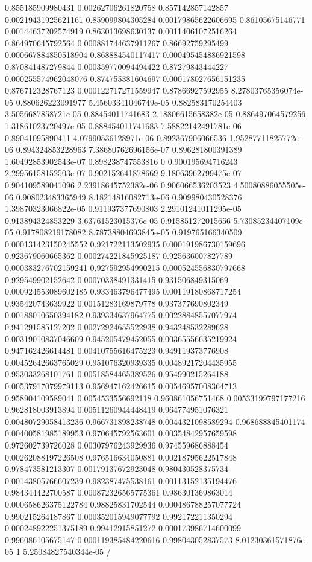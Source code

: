 \begin{table}
\begin{tabu}
\begin{sparkline}{10}
0.855185909980431 0.00262706261820758 0.857142857142857 0.00219431925621161 0.859099804305284 0.00179865622606695 0.86105675146771 0.00144637202574919 0.863013698630137 0.00114061072516264 0.864970645792564 0.000881744637911267 0.86692759295499 0.000667884850518904 0.868884540117417 0.000495454886921598 0.870841487279844 0.000359770094494422 0.87279843444227 0.000255574962048076 0.874755381604697 0.000178027656151235 0.876712328767123 0.000122717271559947 0.87866927592955 8.27803765356074e-05 0.880626223091977 5.45603341046749e-05 0.882583170254403 3.5056687858721e-05 0.88454011741683 2.18806615658382e-05 0.886497064579256 1.31861023720497e-05 0.888454011741683 7.58822142491781e-06 0.89041095890411 4.07990536128971e-06 0.892367906066536 1.95287711825772e-06 0.894324853228963 7.38680762696156e-07 0.896281800391389 1.60492853902543e-07 0.898238747553816 0 0.900195694716243 2.29956158152503e-07 0.902152641878669 9.18063962799475e-07 0.904109589041096 2.23918645752382e-06 0.906066536203523 4.50080886055505e-06 0.908023483365949 8.18214816082713e-06 0.909980430528376 1.39870323066822e-05 0.911937377690803 2.29101241011295e-05 0.913894324853229 3.63761523015376e-05 0.915851272015656 5.73085234407109e-05 0.917808219178082 8.78738804693845e-05 0.919765166340509 0.000131423150245552 0.921722113502935 0.000191986730159696 0.923679060665362 0.000274221845925187 0.925636007827789 0.000383276702159241 0.927592954990215 0.000524556830797668 0.929549902152642 0.00070338491331415 0.931506849315069 0.000924553089602485 0.933463796477495 0.00119180868717254 0.935420743639922 0.00151283169879778 0.937377690802349 0.00188010650394182 0.939334637964775 0.00228848557077974 0.941291585127202 0.00272924655522938 0.943248532289628 0.00319010837046609 0.945205479452055 0.00365556635219924 0.947162426614481 0.00410755616475223 0.949119373776908 0.00452642663765029 0.951076320939335 0.00489217204435955 0.953033268101761 0.00518584465389526 0.954990215264188 0.00537917079979113 0.956947162426615 0.00546957008364713 0.958904109589041 0.0054533556692118 0.960861056751468 0.00533199797177216 0.962818003913894 0.00511260944448419 0.964774951076321 0.00480729058413236 0.966731898238748 0.0044321098589294 0.968688845401174 0.00400581985189953 0.970645792563601 0.00354842957659598 0.972602739726028 0.00307976243929936 0.974559686888454 0.00262088197226508 0.976516634050881 0.00218795622517848 0.978473581213307 0.00179137672923048 0.980430528375734 0.00143805766607239 0.982387475538161 0.00113152135194476 0.984344422700587 0.000872326565775361 0.986301369863014 0.000658626375122784 0.98825831702544 0.000486788257077724 0.990215264187867 0.000352015949077792 0.992172211350294 0.000248922251375189 0.99412915851272 0.000173986714600099 0.996086105675147 0.000119385484220616 0.998043052837573 8.01230361571876e-05 1 5.25084827540344e-05 /

\end{sparkline}
\end{tabu}
\end{table}

